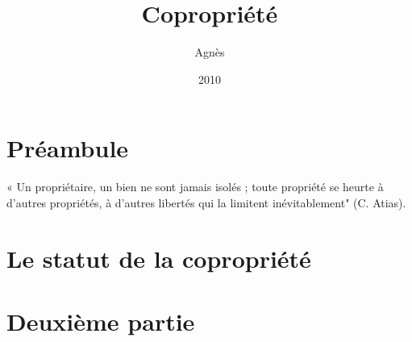 \documentclass[10pt,a4paper,twoside]{book}
\author{Agnès \nom{Lebatteux}}
\title{Copropriété}
\date{2010}
\begin{document}
	\maketitle
	
	\part*{Préambule}
	
		« Un propriétaire, un bien ne sont jamais isolés ; toute
		propriété se heurte à d’autres propriétés, à d’autres libertés
		qui la limitent inévitablement" (C. Atias).
	
		
	
	\part{Le statut de la copropriété}
	
		
		
		
		
		
		
		
		
		
		
		
		
		
		
		
	
	\part{Deuxième partie}
	
	\tableofcontents
	
\end{document}

